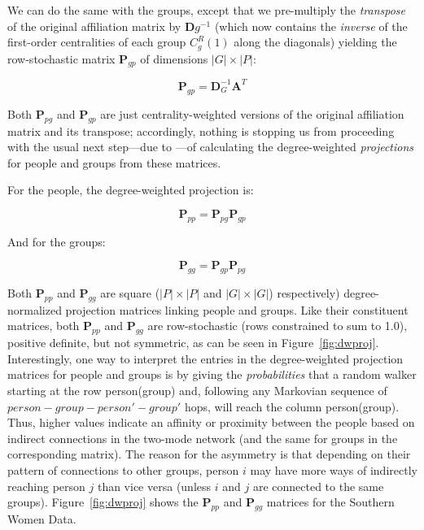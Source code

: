 \documentclass[a4paper,fleqn]{cas-sc}
\begin{document}
We can do the same with the groups, except that we pre-multiply the \textit{transpose} of the original affiliation matrix by $\mathbf{D}g^{-1}$ (which now contains the \textit{inverse} of the first-order centralities of each group $C^R_g(1)$ along the diagonals) yielding the row-stochastic matrix $\mathbf{P}_{gp}$ of dimensions $|G| \times |P|$:

\begin{equation}
    \mathbf{P}_{gp} = \mathbf{D}_G^{-1}\mathbf{A}^T
    \label{eq:ca2}
\end{equation}

Both $\mathbf{P}_{pg}$ and $\mathbf{P}_{gp}$ are just centrality-weighted versions of the original affiliation matrix and its transpose; accordingly, nothing is stopping us from proceeding with the usual next step---due to \citet{breiger1974duality}---of calculating the degree-weighted \textit{projections} for people and groups from these matrices. 

For the people, the degree-weighted projection is:

\begin{equation}
\mathbf{P}_{pp} = \mathbf{P}_{pg}\mathbf{P}_{gp}
    \label{eq:ca3}
\end{equation}

And for the groups:

\begin{equation}
    \mathbf{P}_{gg} = \mathbf{P}_{gp}\mathbf{P}_{pg}
    \label{eq:ca4}
\end{equation}

Both $\mathbf{P}_{pp}$ and $\mathbf{P}_{gg}$ are square ($|P| \times |P|$ and $|G| \times |G|$) respectively) degree-normalized projection matrices linking people and groups. Like their constituent matrices, both $\mathbf{P}_{pp}$ and $\mathbf{P}_{gg}$ are row-stochastic (rows constrained to sum to 1.0), positive definite, but not symmetric, as can be seen in Figure~\ref{fig:dwproj}. Interestingly, one way to interpret the entries in the degree-weighted projection matrices for people and groups is by giving the \textit{probabilities} that a random walker starting at the row person(group) and, following any Markovian sequence of $person-group-person'-group'$ hops, will reach the column person(group). Thus, higher values indicate an affinity or proximity between the people based on indirect connections in the two-mode network (and the same for groups in the corresponding matrix). The reason for the asymmetry is that depending on their pattern of connections to other groups, person $i$ may have more ways of indirectly reaching person $j$ than vice versa (unless $i$ and $j$ are connected to the same groups). Figure~\ref{fig:dwproj} shows the $\mathbf{P}_{pp}$ and $\mathbf{P}_{gg}$ matrices for the Southern Women Data. 
\end{document}
